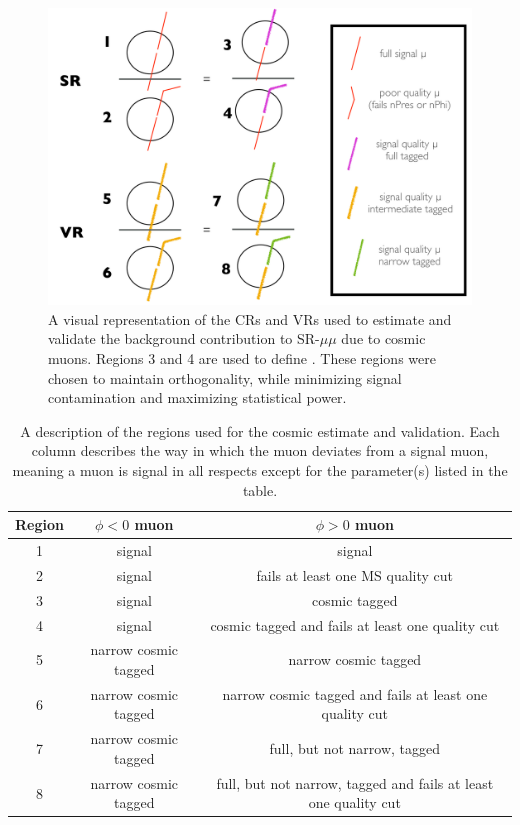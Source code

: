\begin{figure}[!ht]
\centering
\includegraphics[width=.8\textwidth]{figures/cosmics/SR-VR-sketch.png}
\caption{A visual representation of the CRs and VRs used to estimate and validate the background contribution to SR-$\mu\mu$ due to cosmic muons. Regions 3 and 4 are used to define \rgood. These regions were chosen to maintain orthogonality, while minimizing signal contamination and maximizing statistical power.}
\label{fig:cosmic_SRVR}
\end{figure}

\begin{table}
\centering
\begin{tabular}{ccc}
Region & $\phi < 0$ muon & $\phi > 0$ muon \\
\hline
1 & signal & signal\\ 
2 & signal & fails at least one MS quality cut\\ 
3 & signal & cosmic tagged \\ 
4 & signal & cosmic tagged and fails at least one quality cut\\ 
5 & narrow cosmic tagged & narrow cosmic tagged\\ 
6 & narrow cosmic tagged & narrow cosmic tagged and fails at least one quality cut\\ 
7 & narrow cosmic tagged & full, but not narrow, tagged \\ 
8 & narrow cosmic tagged & full, but not narrow, tagged and fails at least one quality cut\\  
\hline
\end{tabular}
\caption{A description of the regions used for the cosmic estimate and validation. Each column describes the way in which the muon deviates from a signal muon, meaning a muon is signal in all respects except for the parameter(s) listed in the table.}
\label{tab:cosmic_SRVR}
\end{table}


